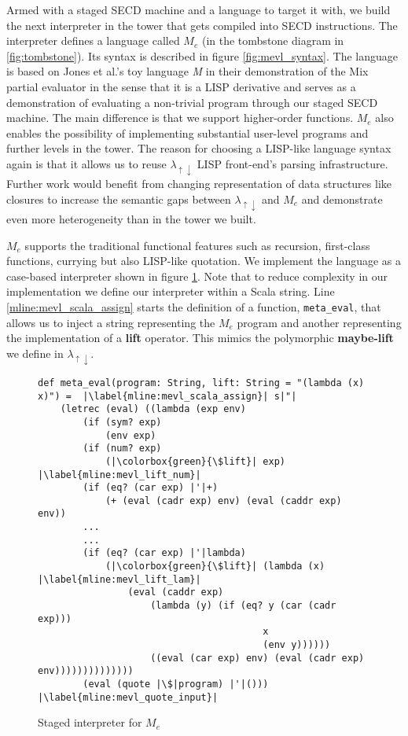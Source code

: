 \documentclass[a4paper,12pt,twoside,openright]{report}
\theoremstyle{definition}
\newcommand{\mslang}{$\lambda_{\uparrow\downarrow}$}
\newcommand{\mevl}{$M_{e}$}
\begin{document}
Armed with a staged SECD machine and a language to target it with, we build the next interpreter in the tower that gets compiled into SECD instructions. The interpreter defines a language called \mevl{} (in the tombstone diagram in \ref{fig:tombstone}). Its syntax is described in figure \ref{fig:mevl_syntax}. The language is based on Jones et al.'s toy language \textit{M} in their demonstration of the Mix partial evaluator \cite{jones1989mix} in the sense that it is a LISP derivative and serves as a demonstration of evaluating a non-trivial program through our staged SECD machine. The main difference is that we support higher-order functions. \mevl{} also enables the possibility of implementing substantial user-level programs and further levels in the tower. The reason for choosing a LISP-like language syntax again is that it allows us to reuse \mslang{} LISP front-end's parsing infrastructure. Further work would benefit from changing representation of data structures like closures to increase the semantic gaps between \mslang{} and \mevl{} and demonstrate even more heterogeneity than in the tower we built.

\mevl{} supports the traditional functional features such as recursion, first-class functions, currying but also LISP-like quotation. We implement the language as a case-based interpreter shown in figure \ref{lst:mevl}. Note that to reduce complexity in our implementation we define our interpreter within a Scala string. Line \ref{mline:mevl_scala_assign} starts the definition of a function, \texttt{meta\_eval}, that allows us to inject a string representing the \mevl{} program and another representing the implementation of a \textbf{lift} operator. This mimics the polymorphic \textbf{maybe-lift} we define in \mslang.

\begin{figure}[htp!]
\centering
\begin{verbatim}
def meta_eval(program: String, lift: String = "(lambda (x) x)") =  |\label{mline:mevl_scala_assign}| s|"|
    (letrec (eval) ((lambda (exp env)
        (if (sym? exp)
            (env exp)
        (if (num? exp)
            (|\colorbox{green}{\$lift}| exp) |\label{mline:mevl_lift_num}|
        (if (eq? (car exp) |'|+)
            (+ (eval (cadr exp) env) (eval (caddr exp) env))
        ...
        ...
        (if (eq? (car exp) |'|lambda)
            (|\colorbox{green}{\$lift}| (lambda (x) |\label{mline:mevl_lift_lam}|
                (eval (caddr exp)
                    (lambda (y) (if (eq? y (car (cadr exp)))
                                        x
                                        (env y))))))
                    ((eval (car exp) env) (eval (cadr exp) env))))))))))))))
        (eval (quote |\$|program) |'|())) |\label{mline:mevl_quote_input}|
\end{verbatim}
\caption{Staged interpreter for \mevl}
\label{lst:mevl}
\end{figure}
\end{document}
